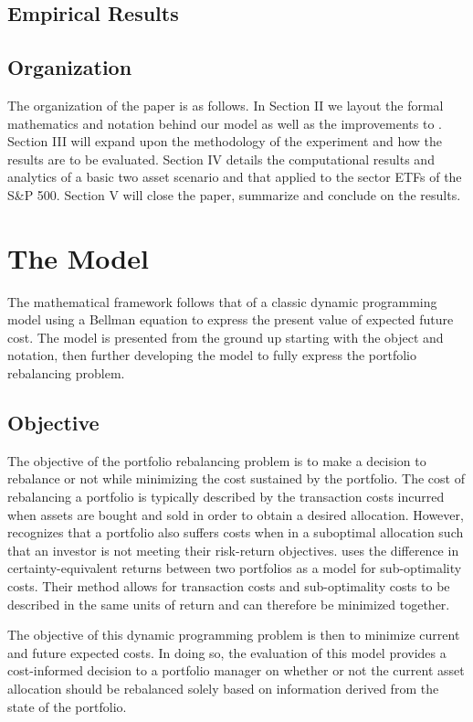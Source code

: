 \documentclass{article}
\begin{document}
\subsection{Empirical Results}

\subsection{Organization} The organization of the paper is as follows. In Section II we layout the formal mathematics and notation behind our model as well as the improvements to \cite{b5}. Section III will expand upon the methodology of the experiment and how the results are to be evaluated. Section IV details the computational results and analytics of a basic two asset scenario and that applied to the sector ETFs of the S\&P 500. Section V will close the paper, summarize and conclude on the results. 

\section{The Model}

The mathematical framework follows that of a classic dynamic programming model using a Bellman equation to express the present value of expected future cost. The model is presented from the ground up starting with the object and notation, then further developing the model to fully express the portfolio rebalancing problem. 

\subsection{Objective}

The objective of the portfolio rebalancing problem is to make a decision to rebalance or not while minimizing the cost sustained by the portfolio. The cost of rebalancing a portfolio is typically described by the transaction costs incurred when assets are bought and sold in order to obtain a desired allocation. However, \cite{b5} recognizes that a portfolio also suffers costs when in a suboptimal allocation such that an investor is not meeting their risk-return objectives. \cite{b5} uses the difference in certainty-equivalent returns between two portfolios as a model for sub-optimality costs. Their method allows for transaction costs and sub-optimality costs to be described in the same units of return and can therefore be minimized together.

The objective of this dynamic programming problem is then to minimize current and future expected costs. In doing so, the evaluation of this model provides a cost-informed decision to a portfolio manager on whether or not the current asset allocation should be rebalanced solely based on information derived from the state of the portfolio.
\end{document}
